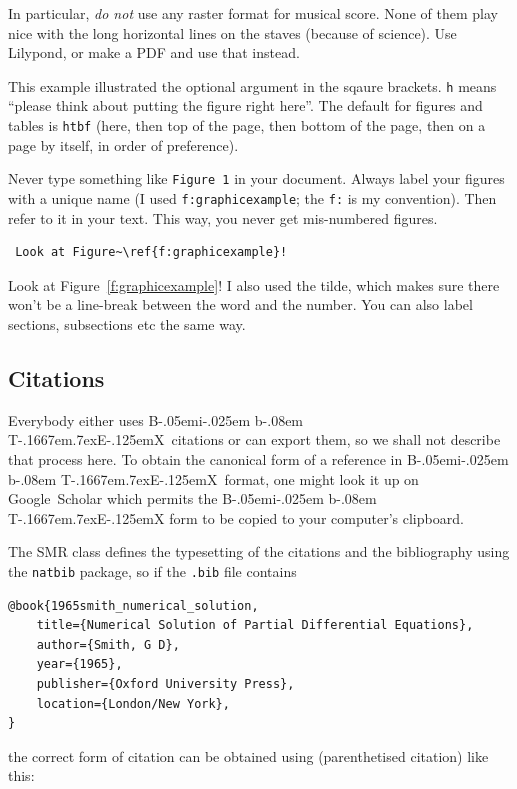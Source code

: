 \documentclass{SMR}
\begin{document}
In particular, \emph{do not} use any raster format for musical score.
None of them play nice with the long horizontal lines on the staves
(because of science). Use Lilypond, or make a PDF and use that instead.

This example illustrated the optional argument in the sqaure brackets.
\texttt{h} means ``please think about putting the figure right here''.
The default for figures and tables is \texttt{htbf} (here, then top of the page,
then bottom of the page, then on a page by itself, in order of preference).

Never type something like \texttt{Figure 1} in your document.
Always label your figures with a unique name (I used \texttt{f:graphicexample};
the \texttt{f:} is my convention). Then refer to it in your text.
This way, you never get mis-numbered figures.

\begin{verbatim}
 Look at Figure~\ref{f:graphicexample}!
\end{verbatim}

Look at Figure~\ref{f:graphicexample}!
I also used the tilde, which makes sure there won't be a line-break between
the word and the number. You can also label sections, subsections etc
the same way.

\subsection{Citations}

\def\BibTeX{{\rm B\kern-.05em{\sc i\kern-.025em b}\kern-.08em
    T\kern-.1667em\lower.7ex\hbox{E}\kern-.125emX}}
Everybody either uses \BibTeX\ citations or can export them, so we shall not
describe that process here. To obtain the canonical form of a reference in
\BibTeX\ format, one might look it up on Google~Scholar which permits the \BibTeX
form to be copied to your computer's clipboard.

The SMR class defines the typesetting of the citations and the bibliography
using the \texttt{natbib} package, so if the \texttt{.bib} file contains

\begin{verbatim}
@book{1965smith_numerical_solution,
	title={Numerical Solution of Partial Differential Equations},
	author={Smith, G D},
	year={1965},
	publisher={Oxford University Press},
	location={London/New York},
}
\end{verbatim}

the correct form of citation can be obtained using 
(parenthetised citation) like this:
\end{document}

